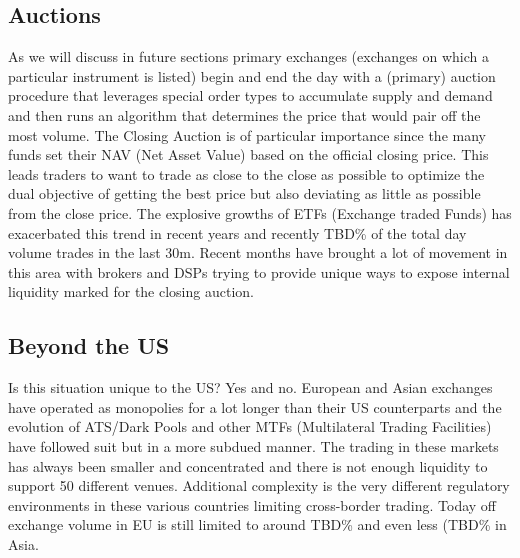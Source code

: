 \subsection{Auctions}
As we will discuss in future sections primary exchanges (exchanges on which a particular instrument is listed) begin and end the day with a (primary) auction procedure that leverages special order types to accumulate supply and demand and then runs an algorithm that determines the price that would pair off the most volume. The Closing Auction is of particular importance since the many funds set their NAV (Net Asset Value) based on the official closing price. This leads traders to want to trade as close to the close as possible to optimize the dual objective of getting the best price but also deviating as little as possible from the close price. The explosive growths of ETFs (Exchange traded Funds) has exacerbated this trend in recent years and recently {TBD}\% of the total day volume trades in the last 30m. Recent months have brought a lot of movement in this area with brokers and DSPs trying to provide unique ways to expose internal liquidity marked for the closing auction.
 
\subsection{Beyond the US}
Is this situation unique to the US? Yes and no. European and Asian exchanges have operated as monopolies for a lot longer than their US counterparts and the evolution of ATS/Dark Pools and other MTFs (Multilateral Trading Facilities) have followed suit but in a more subdued manner. The trading in these markets has always been smaller and concentrated and there is not enough liquidity to support 50 different venues. Additional complexity is the very different regulatory environments in these various countries limiting cross-border trading. Today off exchange volume in EU is still limited to around {TBD}\% and even less ({TBD}\% in Asia.

